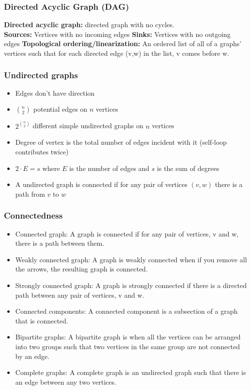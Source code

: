 \documentclass{article}
\begin{document}
\begin{spacing}{1.5}
\begin{spacing}{1.0}
\subsubsection{Directed Acyclic Graph (DAG)}
\label{sec:directedac}
\textbf{Directed acyclic graph:} directed graph with no cycles.\\
\textbf{Sources:} Vertices with no incoming edges
\textbf{Sinks: } Vertices with no outgoing edges
\textbf{Topological ordering/linearization:} An ordered list of all of a graphs' vertices such that for each directed edge (v,w) in the list, v comes before w.
\end{spacing}
\newpage
\subsubsection{Undirected graphs}
\label{sec:undirected}
\begin{spacing}{1}
\begin{itemize}
    \item Edges don't have direction
    \item $\binom{n}{2}$ potential edges on $n$ vertices
    \item $2^{\binom{n}{2}}$ different simple undirected graphs on $n$ vertices
    \item Degree of vertex is the total number of edges incident with it (self-loop contributes twice)
    \item $2 \cdot E = s$ where $E$ is the number of edges and $s$ is the sum of degrees
    \item A undirected graph is connected if for any pair of vertices $(v,w)$ there is a path from $v$ to $w$
\end{itemize}
\end{spacing}
\subsubsection{Connectedness}
\label{sec:connectedness}
\begin{itemize}
    \item Connected graph:
    A graph is connected if for any pair of vertices, v and w, there is a path between them.
    \item Weakly connected graph:
    A graph is weakly connected when if you remove all the arrows, the resulting graph is connected.
    \item Strongly connected graph:
    A graph is strongly connected if there is a directed path between any pair of vertices, v and w.
    \item Connected components:
    A connected component is a subsection of a graph that is connected.
    \item Bipartite graphs:
    A bipartite graph is when all the vertices can be arranged into two groups such that two vertices in the same group are not connected by an edge.
    \item Complete graphs:
    A complete graph is an undirected graph such that there is an edge between any two vertices.
\end{itemize}

\end{spacing}
\end{document}
